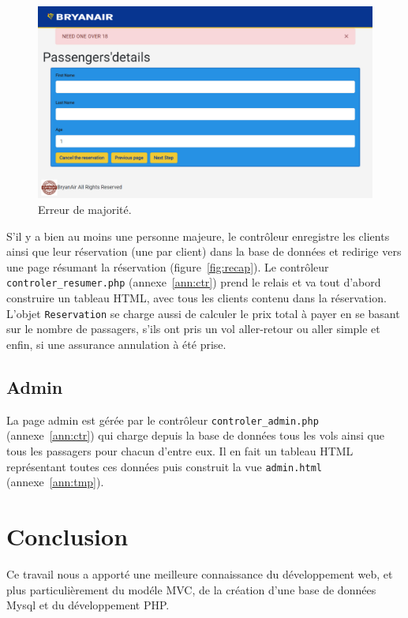 \documentclass[12pt,a4paper]{article}
\begin{document}
			\begin{figure}[!ht]
        \includegraphics[width=\textwidth]{ageError.png}
				\caption{Erreur de majorité.}
				\label{fig:ageError}
			\end{figure}

			S'il y a bien au moins une personne majeure, le contrôleur enregistre les clients ainsi que leur réservation (une par client) dans la base de données et redirige vers une page résumant la réservation (figure~\ref{fig:recap}). Le contrôleur \texttt{controler\_resumer.php} (annexe~\ref{ann:ctr}) prend le relais et va tout d'abord construire un tableau HTML, avec tous les clients contenu dans la réservation. L'objet \texttt{Reservation} se charge aussi de calculer le prix total à payer en se basant sur le nombre de passagers, s'ils ont pris un vol aller-retour ou aller simple et enfin, si une assurance annulation à été prise.

		\subsection{Admin}
			La page admin est gérée par le contrôleur \texttt{controler\_admin.php} (annexe~\ref{ann:ctr}) qui charge depuis la base de données tous les vols ainsi que tous les passagers pour chacun d'entre eux. Il en fait un tableau HTML représentant toutes ces données puis construit la vue \texttt{admin.html} (annexe~\ref{ann:tmp}).

	\section*{Conclusion}
      Ce travail nous a apporté une meilleure connaissance du développement web, et plus particulière\-ment du modéle MVC, de la création d'une base de données Mysql et du développement PHP.
\end{document}

